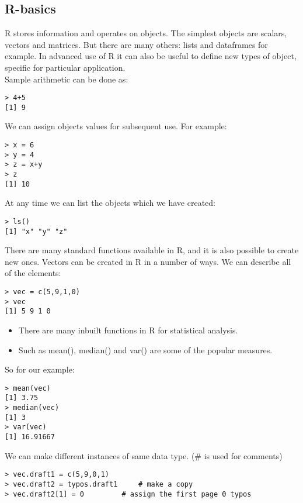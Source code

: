 \documentclass{article}
\begin{document}
 
\subsection{R-basics}
R stores information and operates on objects. The simplest objects are scalars, vectors and matrices.
But there are many others: lists and dataframes for example. In advanced use of R it can also be
useful to define new types of object, specific for particular application.\\

Sample arithmetic can be done as:

\begin{lstlisting}[frame=single]
> 4+5
[1] 9
\end{lstlisting}
 
We can assign objects values for subsequent use. For example:
\begin{lstlisting}[frame=single]
> x = 6
> y = 4
> z = x+y
> z
[1] 10
\end{lstlisting}

At any time we can list the objects which we have created:

\begin{lstlisting}[frame=single]
> ls()
[1] "x" "y" "z"

\end{lstlisting}

There are many standard functions available in R, and it is also possible to create new ones.
Vectors can be created in R in a number of ways. We can describe all of the elements:
\begin{lstlisting}[frame=single]
> vec = c(5,9,1,0)
> vec
[1] 5 9 1 0
\end{lstlisting}

\begin{itemize}
\item There are many inbuilt functions in R for statistical analysis. 
\item Such as mean(), median() and var() are some of the popular measures. 
\end{itemize}

So for our example:

\begin{lstlisting}[frame=single]
> mean(vec)
[1] 3.75
> median(vec)
[1] 3
> var(vec)
[1] 16.91667
\end{lstlisting}

We can make different instances of same data type. (\# is used for comments)
\begin{lstlisting}[frame=single]
> vec.draft1 = c(5,9,0,1)
> vec.draft2 = typos.draft1 	# make a copy
> vec.draft2[1] = 0 		# assign the first page 0 typos
\end{lstlisting}
\end{document}
